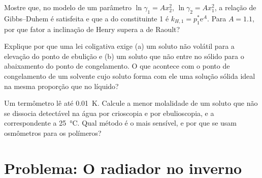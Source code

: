 \begin{exercise}[$\star\star\star$]\label{exo:b2:chemical-potential:10}
Mostre que, no modelo de um parâmetro $\ln\gamma_1 = Ax_2^2$, $\ln\gamma_2 =
Ax_1^2$, a relação de Gibbs--Duhem é satisfeita e que a  do
constituinte 1 é $k_{H,1} = p_1^*\mathrm e^A$. Para $A = 1.1$, por que fator
a inclinação de Henry supera a de Raoult?
\end{exercise}

\begin{exercise}[$\star\star\star$]\label{exo:b2:chemical-potential:11}
Explique por que uma lei coligativa exige (a) um soluto não volátil para a
elevação do ponto de ebulição e (b) um soluto que não entre no sólido para o
abaixamento do ponto de congelamento. O que acontece com o ponto de
congelamento de um solvente cujo soluto forma com ele uma solução sólida
ideal na mesma proporção que no líquido?
\end{exercise}

\begin{exercise}[$\star\star\star$]\label{exo:b2:chemical-potential:12}
Um termômetro lê até \qty{0.01}{K}. Calcule a menor molalidade de um soluto
que não se dissocia detectável na água por crioscopia e por ebulioscopia, e
a  correspondente a \qty{25}{\celsius}. Qual método é o
mais sensível, e por que se usam osmômetros para os polímeros?
\end{exercise}

\section{Problema: O radiador no inverno}

